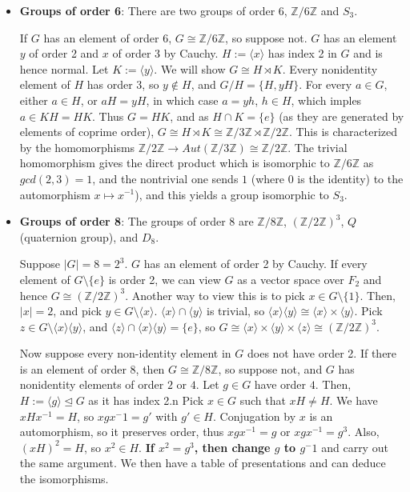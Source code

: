 \documentclass[11pt, oneside]{amsart}   	%
\theoremstyle{definition}
\begin{document}
\begin{itemize}
	\item \textbf{Groups of order 6}: There are two groups of order 6, $\mathbb{Z}/6\mathbb{Z}$ and $S_3$.
	
	If $G$ has an element of order 6, $G \cong \mathbb Z/6\mathbb Z$, so suppose not. $G$ has an element $y$ of order 2 and $x$ of order 3 
	by Cauchy. $H := \langle x\rangle$ has index 2 in $G$ and is hence normal. Let $K := \langle y \rangle$. We will show $G\cong H\rtimes 
	K$. Every nonidentity element of $H$ has order $3$, so $y\notin H$, and $G / H = \{H, yH\}$. For every $a\in G$, 
	either $a\in H$, or $aH = yH$, in which case $a = yh$, $h\in H$, which imples $a\in KH = HK$. Thus $G = HK$, and as $H \cap K = \{e\}$ 
	(as they are generated by elements of coprime order), $G\cong H\rtimes K \cong \mathbb Z/3\mathbb Z\rtimes\mathbb Z / 2\mathbb Z$. This is 
	characterized by the homomorphisms $\mathbb Z / 2\mathbb Z\rightarrow Aut(\mathbb Z/3\mathbb Z)\cong \mathbb Z/2\mathbb Z$. The trivial 
	homomorphism gives the direct product which is isomorphic to $\mathbb Z/6\mathbb Z$ as $gcd(2, 3) = 1$, and the nontrivial one sends $1$ 
	(where $0$ is the identity) to the automorphism $x\mapsto x^{-1}$), and this yields a group isomorphic to $S_3$.
	
	\item \textbf{Groups of order 8}: The groups of order 8 are $\mathbb Z/8\mathbb Z$, $(\mathbb Z/2\mathbb Z)^3$, $Q$ (quaternion group), 
	and $D_8$.
	
	Suppose $|G| = 8 = 2^3$. $G$ has an element of order 2 by Cauchy. If every element of $G\setminus \{e\}$ is order 2, we can view $G$ as 
	a vector space over $F_2$ and hence $G\cong (\mathbb Z/2\mathbb Z)^3$. Another way to view this is to pick $x\in G\setminus\{1\}$. Then, 
	$|x| = 2$, and pick $y\in G\setminus\langle x\rangle$. $\langle x\rangle\cap\langle y\rangle$ is trivial, so $\langle x\rangle\langle y\rangle
	\cong \langle x\rangle\times\langle y\rangle$. Pick $z\in G\setminus\langle x\rangle\langle y\rangle$, and $\langle z\rangle\cap\langle x
	\rangle\langle y\rangle = \{e\}$, so $G\cong \langle x\rangle\times \langle y\rangle\times\langle z\rangle\cong (\mathbb Z/2\mathbb Z)^3$.
	
	Now suppose every non-identity element in $G$ does not have order 2. If there is an element of order $8$, then $G\cong\mathbb Z /8 
	\mathbb Z$, so suppose not, and $G$ has nonidentity elements of order $2$ or $4$. Let $g\in G$ have order $4$. Then, $H := \langle g
	\rangle\trianglelefteq G$ as it has index 2.n Pick $x\in G$ such that $xH\neq H$. We have $xHx^{-1} = H$, so $xgx^-1 = g'$ with $g'\in H$. 
	Conjugation by $x$ is an automorphism, so it preserves order, thus $xgx^{-1} = g$ or $xgx^{-1} = g^3$. Also, $(xH)^2 = H$, so $x^2\in H$.
	\textbf{If $x^2 = g^3$, then change $g$ to $g^-1$} and carry out the same argument. We then have a table of presentations and can deduce 
	the isomorphisms.

\end{itemize}
\end{document}

